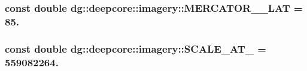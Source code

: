 \subsubsection[{\texorpdfstring{M\+E\+R\+C\+A\+T\+O\+R\+\_\+90\+\_\+\+L\+AT}{MERCATOR_90_LAT}}]{\setlength{\rightskip}{0pt plus 5cm}const double dg\+::deepcore\+::imagery\+::\+M\+E\+R\+C\+A\+T\+O\+R\+\_\+\_\+\+L\+AT = 85.\hspace{0.3cm}{\ttfamily [static]}}\hypertarget{namespacedg_1_1deepcore_1_1imagery_a1e4fbd4aaf439a533b4ca96449f5b025}{}\label{namespacedg_1_1deepcore_1_1imagery_a1e4fbd4aaf439a533b4ca96449f5b025}
\subsubsection[{\texorpdfstring{S\+C\+A\+L\+E\+\_\+\+A\+T\+\_\+0}{SCALE_AT_0}}]{\setlength{\rightskip}{0pt plus 5cm}const double dg\+::deepcore\+::imagery\+::\+S\+C\+A\+L\+E\+\_\+\+A\+T\+\_ = 559082264.\hspace{0.3cm}{\ttfamily [static]}}\hypertarget{namespacedg_1_1deepcore_1_1imagery_a38334ae0e39b6cb795feceeaf7e36a77}{}\label{namespacedg_1_1deepcore_1_1imagery_a38334ae0e39b6cb795feceeaf7e36a77}
